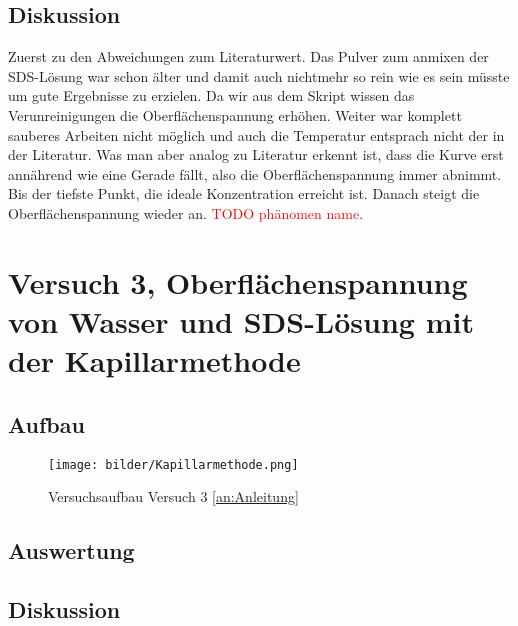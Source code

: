         \subsection{Diskussion}
        Zuerst zu den Abweichungen zum Literaturwert. Das Pulver zum anmixen der SDS-Lösung war schon älter und damit auch nichtmehr so rein wie es sein müsste um gute Ergebnisse zu erzielen. Da wir aus dem Skript wissen das Verunreinigungen die Oberflächenspannung erhöhen. Weiter war komplett sauberes Arbeiten nicht möglich und auch die Temperatur entsprach nicht der in der Literatur. Was man aber analog zu Literatur erkennt ist, dass die Kurve erst annährend wie eine Gerade fällt, also die Oberflächenspannung immer abnimmt. Bis der tiefste Punkt, die ideale Konzentration erreicht ist. Danach steigt die Oberflächenspannung wieder an. \textcolor{red}{TODO phänomen name}. 

    \section{Versuch 3, Oberflächenspannung von Wasser und SDS-Lösung mit der Kapillarmethode}

        \subsection{Aufbau}

            \begin{figure}[H]
                \centering
                \texttt{[image: bilder/Kapillarmethode.png]}
                \caption{Versuchsaufbau Versuch 3 \ref{an:Anleitung}}
                \label{fig:Versuch3_Aufbau}
            \end{figure}

        \subsection{Auswertung}
        
        \subsection{Diskussion}
